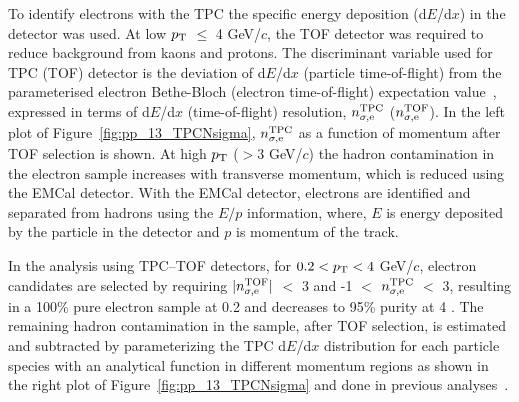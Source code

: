 To identify electrons with the TPC the specific energy deposition (d$E$/d$x$) in the detector was used. At low $p_{\rm T}$ $\leqslant$ 4 GeV/$c$,  the TOF detector was required to reduce background from kaons and protons. The discriminant  variable used for TPC (TOF) detector is the deviation of d$E$/d$x$ (particle time-of-flight) from the parameterised electron Bethe-Bloch (electron time-of-flight) expectation value~\cite{Bethe:1930ku}, expressed in terms of d$E$/d$x$ (time-of-flight) resolution, $n^{\rm{TPC}}_{\sigma,\rm{e}}$ ($n^{\rm{TOF}}_{\sigma,\rm{e}}$). In the left plot of Figure~\ref{fig:pp_13_TPCNsigma}, $n^{\rm{TPC}}_{\sigma,\rm{e}}$ as a function of momentum after TOF selection is shown.  At high $p_{\rm T}$ ($> 3$ GeV/$c$) the hadron contamination in the electron sample increases with transverse momentum, which is reduced using the EMCal detector. With the EMCal detector, electrons are identified and separated from hadrons using the $E/p$ information, where, $E$ is energy deposited by the particle in the detector and $p$ is momentum of the track.

In the analysis using TPC--TOF detectors, for $0.2 < p_{\rm T} < 4$ GeV/$c$, electron candidates are selected by requiring $|n^{\rm{TOF}}_{\sigma,\rm{e}}|$ $<$ 3 and -1 $<$ $n^{\rm{TPC}}_{\sigma,\rm{e}}$ $<$ 3, resulting in a 100\% pure electron sample at 0.2 \GeVc and decreases to 95\% purity at 4 \GeVc.
The remaining hadron contamination in the sample, after TOF selection, is estimated and subtracted by parameterizing the TPC d$E$/d$x$ distribution for each particle species with an analytical function in different momentum regions as shown in the right plot of Figure~\ref{fig:pp_13_TPCNsigma} and done in previous analyses~\cite{Acharya:2019hao, Acharya:2019mom}. 

